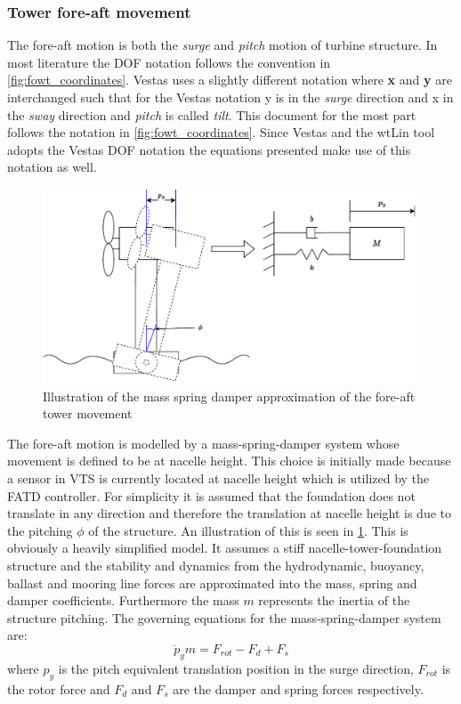 \subsubsection{Tower fore-aft movement} \label{sec:comp_foreaft_mod}
The fore-aft motion is both the \textit{surge} and \textit{pitch} motion of turbine structure. In most literature the DOF notation follows the convention in \cref{fig:fowt_coordinates}. Vestas uses a slightly different notation where \textbf{x} and \textbf{y} are interchanged such that for the Vestas notation y is in the \textit{surge} direction and x in the \textit{sway} direction and \textit{pitch} is called \textit{tilt}. This document for the most part follows the notation in \cref{fig:fowt_coordinates}. Since Vestas and the wtLin tool adopts the Vestas DOF notation the equations presented make use of this notation as well.
\begin{figure}[ht]
	\centering
	\includegraphics[width=0.9\linewidth]{Graphics/wtLinForeAftMotionModel.pdf}
	\caption{Illustration of the mass spring damper approximation of the fore-aft tower movement}
	\label{fig:wtLin_fore-aft_diagram}
\end{figure}
The fore-aft motion is modelled by a mass-spring-damper system whose movement is defined to be at nacelle height. This choice is initially made because a sensor in VTS is currently located at nacelle height which is utilized by the FATD controller. For simplicity it is assumed that the foundation does not translate in any direction and therefore the translation at nacelle height is due to the pitching $ \phi $ of the structure. An illustration of this is seen in \cref{fig:wtLin_fore-aft_diagram}. This is obviously a heavily simplified model. It assumes a stiff nacelle-tower-foundation structure and the stability and dynamics from the hydrodynamic, buoyancy, ballast and mooring line forces are approximated into the mass, spring and damper coefficients. Furthermore the mass $ m $ represents the inertia of the structure pitching. The governing equations for the mass-spring-damper system are:
\begin{equation}\label{eq:comp_fore-aft_ay1}
	\ddot{p}_y m = F_{rot} - F_d + F_s
\end{equation}
where $ p_y $ is the pitch equivalent translation position in the surge direction, $ F_{rot} $ is the rotor force and $ F_d $ and $ F_s $ are the damper and spring forces respectively.

